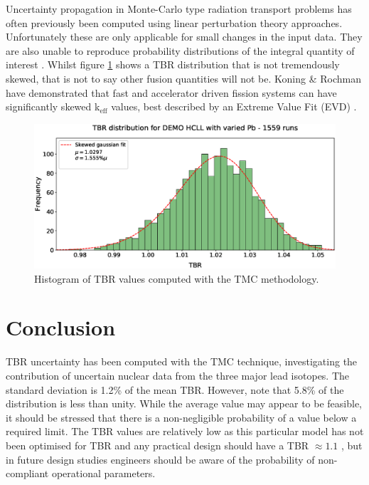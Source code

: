 Uncertainty propagation in Monte-Carlo type radiation transport problems has often previously been computed using linear perturbation theory approaches. Unfortunately these are only applicable for small changes in the input data. They are also unable to reproduce probability distributions of the integral quantity of interest \cite{Rising2012}. Whilst figure \ref{fig:tbr_distribution} shows a TBR distribution that is not tremendously skewed, that is not to say other fusion quantities will not be. Koning \& Rochman have demonstrated that fast and accelerator driven fission systems can have significantly skewed k$_{\mbox{eff}}$ values, best described by an Extreme Value Fit (EVD) \cite{Koning2008}.

\begin{figure}
	\includegraphics[width=\textwidth]{hcll_hist_1559}
	\caption{Histogram of TBR values computed with the TMC methodology.}
	\label{fig:tbr_distribution}
\end{figure}

\section{Conclusion}
TBR uncertainty has been computed with the TMC technique, investigating the contribution of uncertain nuclear data from the three major lead isotopes. The standard deviation is 1.2\% of the mean TBR. However, note that 5.8\% of the distribution is less than unity. While the average value may appear to be feasible, it should be stressed that there is a non-negligible probability of a value below a required limit. The TBR values are relatively low as this particular model has not been optimised for TBR and any practical design should have a TBR $\approx 1.1$ \cite{Fischer2015}, but in future design studies engineers should be aware of the probability of non-compliant operational parameters. 


